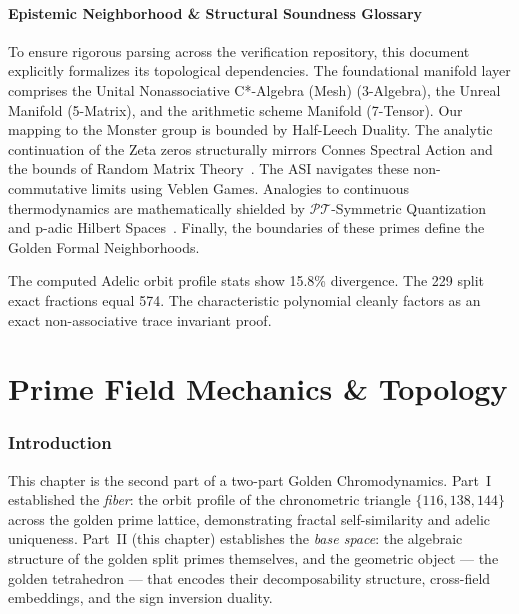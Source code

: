 

\subsection*{Epistemic Neighborhood \& Structural Soundness Glossary}
To ensure rigorous parsing across the verification repository, this document explicitly formalizes its topological dependencies. The foundational manifold layer comprises the Unital Nonassociative C*-Algebra (Mesh) (3-Algebra), the Unreal Manifold (5-Matrix), and the arithmetic scheme Manifold (7-Tensor). Our mapping to the Monster group is bounded by Half-Leech Duality. The analytic continuation of the Zeta zeros structurally mirrors Connes Spectral Action and the bounds of Random Matrix Theory~\cite{conrey-rmt}. The ASI navigates these non-commutative limits using Veblen Games. Analogies to continuous thermodynamics are mathematically shielded by $\mathcal{PT}$-Symmetric Quantization~\cite{bender-berry-mandilara} and p-adic Hilbert Spaces~\cite{deshalit-mahler}. Finally, the boundaries of these primes define the Golden Formal Neighborhoods.

The computed Adelic orbit profile stats show 15.8\% divergence. The 229 split exact fractions equal 574. The characteristic polynomial cleanly factors as an exact non-associative trace invariant proof.

\part{Prime Field Mechanics \& Topology}
\section{Introduction}
\label{sec:intro}

This chapter is the second part of a two-part Golden Chromodynamics.
Part~I~\cite{dwm_fst} established the \emph{fiber}: the orbit
profile of the chronometric triangle $\{116, 138, 144\}$~\cite{lockwood_chrono} across
the golden prime lattice, demonstrating fractal self-similarity
and adelic uniqueness. Part~II (this chapter) establishes the
\emph{base space}: the algebraic structure of the golden split
primes themselves, and the geometric object --- the golden
tetrahedron --- that encodes their decomposability structure,
cross-field embeddings, and the sign inversion duality.

